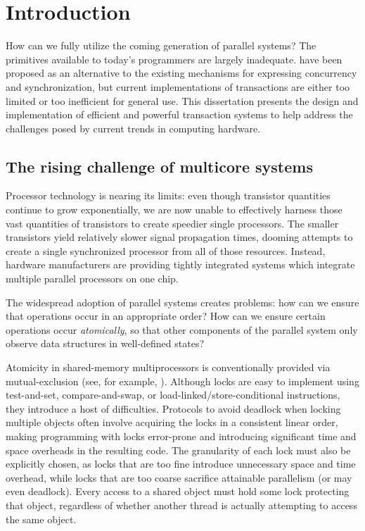 \chapter{Introduction}\label{cha:intro}

How can we fully utilize the coming generation of parallel systems?
The primitives available to today's programmers are largely
inadequate.   have been proposed as an
alternative to the existing mechanisms for expressing concurrency and
synchronization, but current implementations of transactions are
either too limited or too 
inefficient for general use.  This dissertation presents the design
and implementation of efficient and powerful transaction systems to
help address the challenges posed by current trends in computing
hardware.

\section{The rising challenge of multicore systems}
Processor technology is nearing its limits: even
though transistor quantities continue to grow exponentially, we are
now unable to effectively harness those vast quantities of transistors
to create speedier single processors.  The smaller transistors yield
relatively slower signal propagation times, dooming attempts to create
a single synchronized processor from all of those resources.
Instead, hardware manufacturers are providing tightly integrated
 systems which integrate multiple parallel
processors on one chip.

The widespread adoption of parallel systems creates problems: how can
we ensure that operations occur in an appropriate order?
How can we ensure certain operations occur
\textit{atomically}, so that other components of the parallel system
only observe data structures in well-defined states?

Atomicity in shared-memory multiprocessors is 
conventionally provided
via mutual-exclusion  (see, for example,
\cite[p.~35]{Tanenbaum92}).  Although locks are easy to
implement using test-and-set, compare-and-swap, or
load-linked/{\bp}store-conditional instructions, they introduce a host of
difficulties.  Protocols to avoid deadlock when locking multiple
objects often involve acquiring the locks in a consistent linear
order, making programming with locks error-prone and introducing
significant time and space overheads in the resulting code.  The
granularity of each lock must also be
explicitly chosen, as locks that are too fine introduce unnecessary
space and time overhead, while locks that are too coarse sacrifice
attainable parallelism (or may even deadlock).  Every access to a
shared object must hold some lock protecting that object, regardless
of whether another thread is actually attempting to access the same object.

